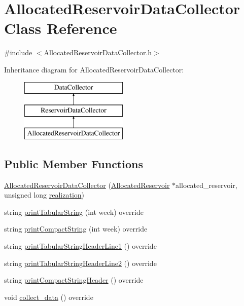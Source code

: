 \hypertarget{classAllocatedReservoirDataCollector}{}\section{Allocated\+Reservoir\+Data\+Collector Class Reference}
\label{classAllocatedReservoirDataCollector}


{\ttfamily \#include $<$Allocated\+Reservoir\+Data\+Collector.\+h$>$}

Inheritance diagram for Allocated\+Reservoir\+Data\+Collector\+:\begin{figure}[H]
\begin{center}
\leavevmode
\includegraphics[height=3.000000cm]{classAllocatedReservoirDataCollector}
\end{center}
\end{figure}
\subsection*{Public Member Functions}
\begin{DoxyCompactItemize}
\item 
\mbox{\hyperlink{classAllocatedReservoirDataCollector_a512b8604164f43d08f961e0f433678e3}{Allocated\+Reservoir\+Data\+Collector}} (\mbox{\hyperlink{classAllocatedReservoir}{Allocated\+Reservoir}} $\ast$allocated\+\_\+reservoir, unsigned long \mbox{\hyperlink{classDataCollector_a9ef2887466fe3123aa19ef956a219b96}{realization}})
\item 
string \mbox{\hyperlink{classAllocatedReservoirDataCollector_ae5a9aa9b2a3cffd8f5ffe983c8fcf6c8}{print\+Tabular\+String}} (int week) override
\item 
string \mbox{\hyperlink{classAllocatedReservoirDataCollector_a35f8125d428e65c737ff3360ae9bd0cd}{print\+Compact\+String}} (int week) override
\item 
string \mbox{\hyperlink{classAllocatedReservoirDataCollector_ae82c7a68af1dce9003cccc6da1800e28}{print\+Tabular\+String\+Header\+Line1}} () override
\item 
string \mbox{\hyperlink{classAllocatedReservoirDataCollector_a30d8c59205862822f6548472ba62e537}{print\+Tabular\+String\+Header\+Line2}} () override
\item 
string \mbox{\hyperlink{classAllocatedReservoirDataCollector_adbedebdf593bee81447671fb8f6ef2fe}{print\+Compact\+String\+Header}} () override
\item 
void \mbox{\hyperlink{classAllocatedReservoirDataCollector_a8ef8451d2cc6eb01b205eee75ab93729}{collect\+\_\+data}} () override
\end{DoxyCompactItemize}
